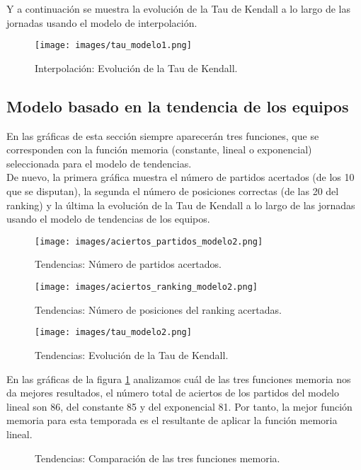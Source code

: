 Y a continuación se muestra la evolución de la Tau de Kendall a lo largo de las jornadas usando el modelo de interpolación.
\begin{figure}[H]
	\centering
	\texttt{[image: images/tau\_modelo1.png]}
	\caption{Interpolación: Evolución de la Tau de Kendall.}
\end{figure}

\subsection{Modelo basado en la tendencia de los equipos}
En las gráficas de esta sección siempre aparecerán tres funciones, que se corresponden con la función memoria (constante, lineal o exponencial) seleccionada para el modelo de tendencias.\\

De nuevo, la primera gráfica muestra el número de partidos acertados (de los 10 que se disputan), la segunda el número de posiciones correctas (de las 20 del ranking) y la última la evolución de la Tau de Kendall a lo largo de las jornadas usando el modelo de tendencias de los equipos.
\begin{figure}[H]
	\centering
	\texttt{[image: images/aciertos\_partidos\_modelo2.png]}
	\caption{Tendencias: Número de partidos acertados.}
\end{figure}

\begin{figure}[H]
	\centering
	\texttt{[image: images/aciertos\_ranking\_modelo2.png]}
	\caption{Tendencias: Número de posiciones del ranking acertadas.}
\end{figure}

\begin{figure}[H]
	\centering
	\texttt{[image: images/tau\_modelo2.png]}
	\caption{Tendencias: Evolución de la Tau de Kendall.}
\end{figure}
En las gráficas de la figura \ref{fig:comparacion_func} analizamos cuál de las tres funciones memoria nos da mejores resultados, el número total de aciertos de los partidos del modelo lineal son 86, del constante 85 y del exponencial 81. Por tanto, la mejor función memoria para esta temporada es el resultante de aplicar la función memoria lineal.
\begin{figure}[H]
	\centering
	\caption{Tendencias: Comparación de las tres funciones memoria.} \label{fig:comparacion_func}
\end{figure} 


